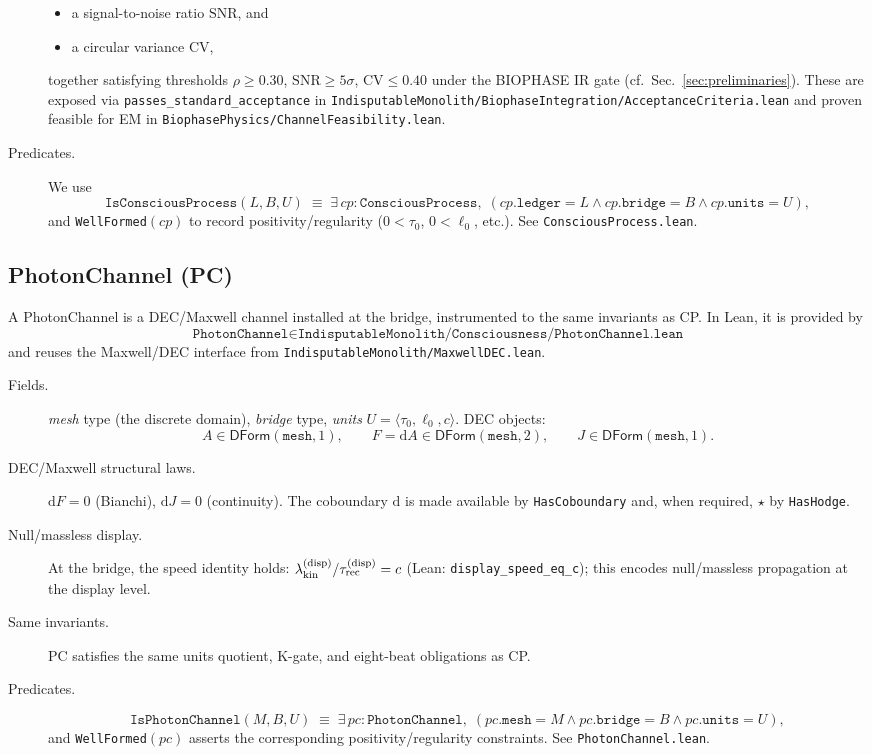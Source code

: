 \documentclass[12pt,a4paper]{article}
\begin{document}
\begin{description}
\begin{itemize}
    \item a signal-to-noise ratio \(\mathrm{SNR}\), and
    \item a circular variance \(\mathrm{CV}\),
  \end{itemize}
  together satisfying thresholds \(\rho\ge 0.30\), \(\mathrm{SNR}\ge 5\sigma\), \(\mathrm{CV}\le 0.40\) under the BIOPHASE IR gate (cf.\ Sec.~\ref{sec:preliminaries}). These are exposed via \texttt{passes\_standard\_acceptance} in \texttt{IndisputableMonolith/BiophaseIntegration/AcceptanceCriteria.lean} and proven feasible for EM in \texttt{BiophasePhysics/ChannelFeasibility.lean}.
  \item[Predicates.] We use
  \[
    \texttt{IsConsciousProcess}(L,B,U)
    \;\equiv\;
    \exists\, cp:\texttt{ConsciousProcess},\;
      (cp.\texttt{ledger}=L \wedge cp.\texttt{bridge}=B \wedge cp.\texttt{units}=U),
  \]
  and \texttt{WellFormed}\((cp)\) to record positivity/regularity (\(0<\tau_0\), \(0<\ell_0\), etc.). See \texttt{ConsciousProcess.lean}.
\end{description}

\subsection{PhotonChannel (PC)}
A PhotonChannel is a DEC/Maxwell channel installed at the bridge, instrumented to the same invariants as CP. In Lean, it is provided by
\[
  \texttt{PhotonChannel} \in \texttt{IndisputableMonolith/Consciousness/PhotonChannel.lean}
\]
and reuses the Maxwell/DEC interface from \texttt{IndisputableMonolith/MaxwellDEC.lean}.
\begin{description}
  \item[Fields.] 
  \emph{mesh} type (the discrete domain), \emph{bridge} type, \emph{units} \(U=\langle \tau_0,\ell_0,c\rangle\). DEC objects:
  \[
    A\in \mathsf{DForm}(\texttt{mesh},1),\qquad
    F=\mathrm{d}A\in \mathsf{DForm}(\texttt{mesh},2),\qquad
    J\in \mathsf{DForm}(\texttt{mesh},1).
  \]
  \item[DEC/Maxwell structural laws.] 
  \(
    \mathrm{d}F=0
  \) (Bianchi),
  \(
    \mathrm{d}J=0
  \) (continuity). The coboundary \(\mathrm{d}\) is made available by \texttt{HasCoboundary} and, when required, \(\star\) by \texttt{HasHodge}.
  \item[Null/massless display.] At the bridge, the speed identity holds:
  \(
    \lambda_{\rm kin}^{\rm (disp)}/\tau_{\rm rec}^{\rm (disp)} = c
  \)
  (Lean: \texttt{display\_speed\_eq\_c}); this encodes null/massless propagation at the display level.
  \item[Same invariants.] PC satisfies the same units quotient, K-gate, and eight-beat obligations as CP.
  \item[Predicates.] 
  \[
    \texttt{IsPhotonChannel}(M,B,U)
    \;\equiv\;
    \exists\, pc:\texttt{PhotonChannel},\;
      (pc.\texttt{mesh}=M \wedge pc.\texttt{bridge}=B \wedge pc.\texttt{units}=U),
  \]
  and \texttt{WellFormed}\((pc)\) asserts the corresponding positivity/regularity constraints. See \texttt{PhotonChannel.lean}.
\end{description}
\end{document}
